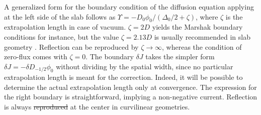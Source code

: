\documentclass{ictt26}
\providecommand{\DIFadd}[1]{{\protect\color{blue}\uwave{#1}}} %
\providecommand{\DIFdel}[1]{{\protect\color{red}\sout{#1}}}                      %
\providecommand{\DIFaddbegin}{} %
\providecommand{\DIFaddend}{} %
\providecommand{\DIFdelbegin}{} %
\providecommand{\DIFdelend}{} %
\newcommand{\DIFscaledelfig}{0.5}
\newlength{\DIFdelgraphicswidth} %
\newlength{\DIFdelgraphicsheight} %
\newcommand{\DIFaddincludegraphics}[2][]{{\color{blue}\fbox{\DIFOincludegraphics[#1]{#2}}}} %
\newcommand{\DIFdelincludegraphics}[2][]{%
\sbox{\DIFdelgraphicsbox}{\DIFOincludegraphics[#1]{#2}}%
\settoboxwidth{\DIFdelgraphicswidth}{\DIFdelgraphicsbox} %
\settoboxtotalheight{\DIFdelgraphicsheight}{\DIFdelgraphicsbox} %
\scalebox{\DIFscaledelfig}{%
\parbox[b]{\DIFdelgraphicswidth}{\usebox{\DIFdelgraphicsbox}\\[-\baselineskip] \rule{\DIFdelgraphicswidth}{0em}}\llap{\resizebox{\DIFdelgraphicswidth}{\DIFdelgraphicsheight}{%
\setlength{\unitlength}{\DIFdelgraphicswidth}%
\begin{picture}(1,1)%
\thicklines\linethickness{2pt} %
{\color[rgb]{1,0,0}\put(0,0){\framebox(1,1){}}}%
{\color[rgb]{1,0,0}\put(0,0){\line( 1,1){1}}}%
{\color[rgb]{1,0,0}\put(0,1){\line(1,-1){1}}}%
\end{picture}%
}\hspace*{3pt}}} %
} %
\DeclareRobustCommand{\DIFaddbegin}{\DIFOaddbegin \let\includegraphics\DIFaddincludegraphics} %
\DeclareRobustCommand{\DIFaddend}{\DIFOaddend \let\includegraphics\DIFOincludegraphics} %
\DeclareRobustCommand{\DIFdelbegin}{\DIFOdelbegin \let\includegraphics\DIFdelincludegraphics} %
\DeclareRobustCommand{\DIFdelend}{\DIFOaddend \let\includegraphics\DIFOincludegraphics} %
\begin{document}
A generalized form for the boundary condition of the diffusion equation applying at the left side of the slab follows as $\Upsilon = - D_0 \phi_0 / (\Delta_0 / 2 + \zeta)$, where $\zeta$ is the extrapolation length in case of vacuum. $\zeta = 2D$ yields the Marshak boundary conditions for instance, but the value $\zeta = 2.13D$ is usually recommended in slab geometry \cite{stamm1983methods}. Reflection can be reproduced by $\zeta \rightarrow \infty$, whereas the condition of zero-flux comes with $\zeta = 0$. The boundary $\delta J$ takes the simpler form $\delta J = - \delta D_{-1/2} \phi_0$ without dividing by the spatial width, since no particular extrapolation length is meant for the correction. Indeed, it will be possible to determine the actual extrapolation length only at convergence. The expression for the right boundary is straightforward, implying a non-negative current. Reflection is always \DIFdelbegin \DIFdel{reproduced }\DIFdelend \DIFaddbegin \DIFadd{assumed }\DIFaddend at the center in curvilinear geometries.
\end{document}
